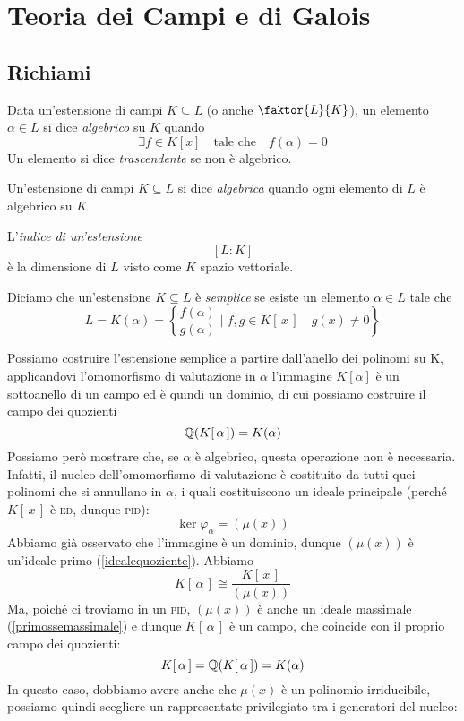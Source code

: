 \setcounter{section}{10} %
\section{Teoria dei Campi e di Galois}

\subsection{Richiami}
\begin{multicols}{2}

\begin{definition}
	Data un'estensione di campi $ K \subseteq L $ (o anche $ \faktor{L}{K} $), un elemento $ \alpha \in L $ si dice \emph{algebrico} su $ K $ quando 
	\[ \exists f \in K[x] \quad \text{tale che} \quad f(\alpha) = 0 \]
	Un elemento si dice \emph{trascendente} se non è algebrico.
\end{definition}

\begin{definition}
	Un'estensione di campi $ K \subseteq L $ si dice \emph{algebrica} quando ogni elemento di $ L $ è algebrico su $ K $
\end{definition}

\begin{definition}
	L'\emph{indice di un'estensione} $$  [L:K]  $$ è la dimensione di $ L $ visto come $ K $ spazio vettoriale.
\end{definition}

\begin{definition}
	Diciamo che un'estensione $ K \subseteq L $ è \emph{semplice} se esiste un elemento $ \alpha \in L $ tale che
	\[ L = K(\alpha) = \left\{ \frac{f(\alpha)}{g(\alpha)} \mid f, g \in K[\,x\,] \quad g(x) \neq 0  \right\} \]
\end{definition}

Possiamo costruire l'estensione semplice a partire dall'anello dei polinomi su K, applicandovi l'omomorfismo di valutazione in $ \alpha $
l'immagine $ K[\alpha] $ è un sottoanello di un campo ed è quindi un dominio, di cui possiamo costruire il campo dei quozienti
\[ \mathbb{Q}(K[\,\alpha\,]) = K(\alpha) \]
Possiamo però mostrare che, se $ \alpha $ è algebrico, questa operazione non è necessaria. Infatti, il nucleo dell'omomorfismo di valutazione è costituito da tutti quei polinomi che si annullano in $ \alpha $, i quali costituiscono un ideale principale (perché $ K[\,x\,] $ è \textsc{ed}, dunque \textsc{pid}):
\[ \ker\varphi_\alpha = (\mu(x)) \]
Abbiamo già osservato che  l'immagine è un dominio, dunque $ (\mu(x)) $ è un'ideale primo (\ref{idealequoziente}). Abbiamo
\[ K[\,\alpha\,] \cong \frac{K[\,x\,]}{(\mu(x))} \]
Ma, poiché ci troviamo in un \textsc{pid}, $ (\mu(x)) $ è anche un ideale massimale (\ref{primossemassimale}) e dunque $ K[\,\alpha\,] $ è un campo, che coincide con il proprio campo dei quozienti:
\[ K[\,\alpha\,] = \mathbb{Q}(K[\,\alpha\,]) = K(\alpha) \]
In questo caso, dobbiamo avere anche che $ \mu(x) $ è un polinomio irriducibile, possiamo quindi scegliere un rappresentate privilegiato tra i generatori del nucleo:


\end{multicols}

